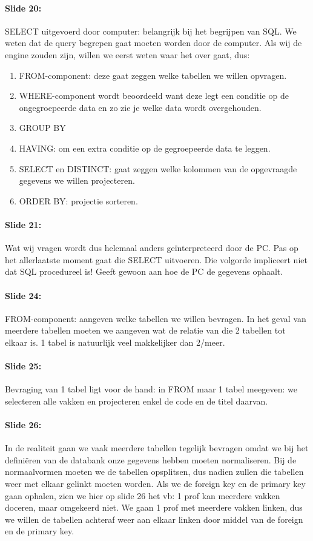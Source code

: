 \documentclass[10pt,a4paper]{report}
\begin{document}
\paragraph{Slide 20:}SELECT uitgevoerd door computer: belangrijk bij het begrijpen van SQL. We weten dat de query begrepen gaat moeten worden door de computer. Als wij de engine zouden zijn, willen we eerst weten waar het over gaat, dus:
\begin{enumerate}
\item FROM-component: deze gaat zeggen welke tabellen we willen opvragen.
\item WHERE-component wordt beoordeeld want deze legt een conditie op de ongegroepeerde data en zo zie je welke data wordt overgehouden. 
\item GROUP BY 
\item HAVING: om een extra conditie op de gegroepeerde data te leggen. 
\item SELECT en DISTINCT: gaat zeggen welke kolommen van de opgevraagde gegevens we willen projecteren. 
\item ORDER BY: projectie sorteren.
\end{enumerate}

\paragraph{Slide 21:}Wat wij vragen wordt dus helemaal anders geïnterpreteerd door de PC. Pas op het allerlaatste moment gaat die SELECT uitvoeren. Die volgorde impliceert niet dat SQL procedureel is! Geeft gewoon aan hoe de PC de gegevens ophaalt.

\paragraph{Slide 24:}FROM-component: aangeven welke tabellen we willen bevragen. In het geval van meerdere tabellen moeten we aangeven wat de relatie van die 2 tabellen tot elkaar is. 1 tabel is natuurlijk veel makkelijker dan 2/meer.

\paragraph{Slide 25:}Bevraging van 1 tabel ligt voor de hand: in FROM maar 1 tabel meegeven: we selecteren alle vakken en projecteren enkel de code en de titel daarvan.

\paragraph{Slide 26:}In de realiteit gaan we vaak meerdere tabellen tegelijk bevragen omdat we bij het definiëren van de databank onze gegevens hebben moeten normaliseren. Bij de normaalvormen moeten we de tabellen opsplitsen, dus nadien zullen die tabellen weer met elkaar gelinkt moeten worden. Als we de foreign key en de primary key gaan ophalen, zien we hier op slide 26 het vb: 1 prof kan meerdere vakken doceren, maar omgekeerd niet. We gaan 1 prof met meerdere vakken linken, dus we willen de tabellen achteraf weer aan elkaar linken door middel van de foreign en de primary key.
\end{document}
